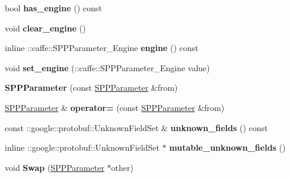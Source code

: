 \begin{DoxyCompactItemize}
bool {\bfseries has\+\_\+engine} () const
\item 
\mbox{\label{classcaffe_1_1_s_p_p_parameter_a99fcbfcc5055ad8d2667e8aedfa2a7f3}} 
void {\bfseries clear\+\_\+engine} ()
\item 
\mbox{\label{classcaffe_1_1_s_p_p_parameter_a85e287eba66fc80cfbac223fb77f2a6b}} 
inline \+::caffe\+::\+S\+P\+P\+Parameter\+\_\+\+Engine {\bfseries engine} () const
\item 
\mbox{\label{classcaffe_1_1_s_p_p_parameter_a369847647961c5fefe0fbcaf6bfdc586}} 
void {\bfseries set\+\_\+engine} (\+::caffe\+::\+S\+P\+P\+Parameter\+\_\+\+Engine value)
\item 
\mbox{\label{classcaffe_1_1_s_p_p_parameter_abbd9921cd4d95074ccc7ea42ceccd4ab}} 
{\bfseries S\+P\+P\+Parameter} (const \mbox{\hyperlink{classcaffe_1_1_s_p_p_parameter}{S\+P\+P\+Parameter}} \&from)
\item 
\mbox{\label{classcaffe_1_1_s_p_p_parameter_a7ca19438883d364f17cb716a4ac23829}} 
\mbox{\hyperlink{classcaffe_1_1_s_p_p_parameter}{S\+P\+P\+Parameter}} \& {\bfseries operator=} (const \mbox{\hyperlink{classcaffe_1_1_s_p_p_parameter}{S\+P\+P\+Parameter}} \&from)
\item 
\mbox{\label{classcaffe_1_1_s_p_p_parameter_ad03c67c167131f29511e0b57fc93a134}} 
const \+::google\+::protobuf\+::\+Unknown\+Field\+Set \& {\bfseries unknown\+\_\+fields} () const
\item 
\mbox{\label{classcaffe_1_1_s_p_p_parameter_ae01b7347735ebbdf0255178d236bea3f}} 
inline \+::google\+::protobuf\+::\+Unknown\+Field\+Set $\ast$ {\bfseries mutable\+\_\+unknown\+\_\+fields} ()
\item 
\mbox{\label{classcaffe_1_1_s_p_p_parameter_a5715173e01679dbd5c25fa3f1cd358db}} 
void {\bfseries Swap} (\mbox{\hyperlink{classcaffe_1_1_s_p_p_parameter}{S\+P\+P\+Parameter}} $\ast$other)
\item 
\mbox{\label{classcaffe_1_1_s_p_p_parameter_ae69922a248b772aae7c300b12723ace0}} 

\end{DoxyCompactItemize}
